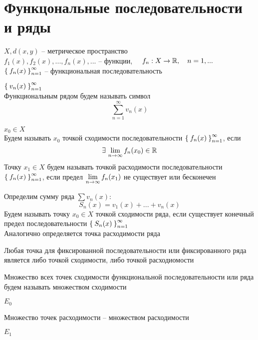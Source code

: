 \chapter{Функцональные последовательности и ряды}

\begin{definition}
	$ X, d(x, y) $ -- метрическое пространство \\
	$ f_1(x), f_2(x), ..., f_n(x), ... $ -- функции, $ \quad f_n : X \to \mathbb{R}, \quad n = 1, ... $ \\
	$ \Set{f_n(x)}_{n=1}^{\infty} $ -- функциональная последовательность
\end{definition}

\begin{definition}
	$ \Set{v_n(x)}_{n=1}^{\infty} $ \\
	Функциональным рядом будем называть символ
	$$ \sum_{n = 1}^\infty v_n(x) $$
\end{definition}

\begin{definition}
	$ x_0 \in X $ \\
	Будем называть $ x_0 $ точкой сходимости последовательности $ \Set{f_n(x)}_{n=1}^{\infty} $, если
	$$ \exists\, \lim\limits_{n \to \infty}f_n(x_0) \in \mathbb{R} $$
	Точку $ x_1 \in X $ будем называть точкой расходимости последовательности $ \Set{f_n(x)}_{n=1}^{\infty} $, если предел $ \lim\limits_{n\to\infty} f_n(x_1) $ не существует или бесконечен
\end{definition}

\begin{definition}
	Определим сумму ряда $ \sum v_n(x) $:
	$$ S_n(x) = v_1(x) + ... + v_n(x) $$
	Будем называть точку $ x_0 \in X $ точкой сходимости ряда, если существует конечный предел последовательности $ \Set{S_n(x)}_{n=1}^{\infty} $ \\
	Аналогично определяется точка расходимости ряда
\end{definition}

\begin{remark}
	Любая точка для фиксированной последовательности или фиксированного ряда является либо точкой сходимости, либо точкой расходиомости
\end{remark}

\begin{definition}
	Множество всех точек сходимости функциональной последовательности или ряда будем называть множеством сходимости
	\begin{notation}
		$ E_0 $
	\end{notation}
	Множество точек расходимости -- множеством расходимости
	\begin{notation}
		$ E_1 $
	\end{notation}
\end{definition}

